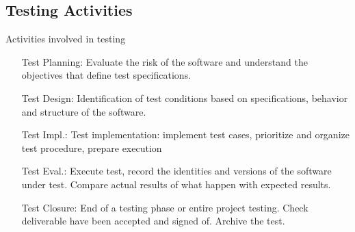 
\subsection{Testing Activities}


\begin{frame}[fragile]

\begin{block}{Activities involved in testing}
\begin{enumerate}[align=parleft]
\item [\small Test Planning:] Evaluate the risk of the software and understand the objectives that define test specifications.
\item [\small Test Design:] Identification of test conditions based on specifications, behavior and structure of the software.
\item [\small Test Impl.:] Test implementation: implement test cases, prioritize and organize test procedure, prepare execution
\item [\small Test Eval.:] Execute test, record the identities and versions of the software under test. Compare actual results of what happen with expected results.
\item [\small Test Closure:] End of a testing phase or entire project testing. Check deliverable have been accepted and signed of. Archive the test.
\end{enumerate}
\end{block}
\end{frame}
